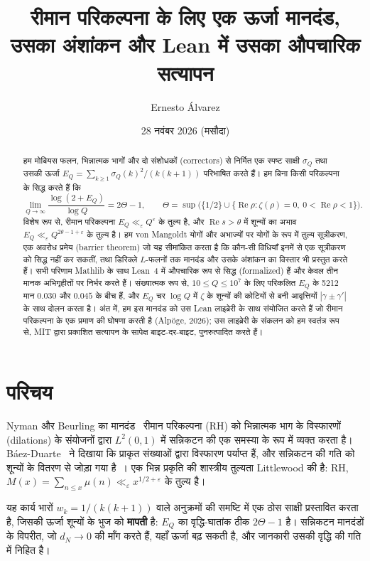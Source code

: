 \documentclass[11pt,a4paper]{amsart}
\title[रीमान परिकल्पना के लिए एक ऊर्जा मानदंड]{रीमान परिकल्पना के लिए एक ऊर्जा मानदंड, उसका अंशांकन और Lean में उसका औपचारिक सत्यापन}
\author{{\latinfont Ernesto \'Alvarez}}
\date{28 नवंबर 2026 (मसौदा)}
\theoremstyle{definition}
\theoremstyle{remark}
\renewcommand{\Re}{\operatorname{Re}}
\begin{document}
\begin{abstract}
हम मोबियस फलन, भिन्नात्मक भागों और दो संशोधकों (correctors) से निर्मित एक स्पष्ट साक्षी $\sigma_Q$ तथा उसकी ऊर्जा $E_Q=\sum_{k\ge1}\sigma_Q(k)^2/(k(k+1))$ परिभाषित करते हैं। हम बिना किसी परिकल्पना के सिद्ध करते हैं कि
\[
  \lim_{Q\to\infty}\frac{\log(2+E_Q)}{\log Q}=2\Theta-1,
  \qquad \Theta=\sup\bigl(\{1/2\}\cup\{\Re\rho:\zeta(\rho)=0,\ 0<\Re\rho<1\}\bigr).
\]
विशेष रूप से, रीमान परिकल्पना $E_Q\ll_\varepsilon Q^\varepsilon$ के तुल्य है, और $\Re s>\theta$ में शून्यों का अभाव $E_Q\ll_\varepsilon Q^{2\theta-1+\varepsilon}$ के तुल्य है। हम von Mangoldt योगों और अभाज्यों पर योगों के रूप में तुल्य सूत्रीकरण, एक अवरोध प्रमेय (barrier theorem) जो यह सीमांकित करता है कि कौन-सी विधियाँ इनमें से एक सूत्रीकरण को सिद्ध नहीं कर सकतीं, तथा डिरिक्ले $L$-फलनों तक मानदंड और उसके अंशांकन का विस्तार भी प्रस्तुत करते हैं। सभी परिणाम Mathlib के साथ Lean~4 में औपचारिक रूप से सिद्ध (formalized) हैं और केवल तीन मानक अभिगृहीतों पर निर्भर करते हैं। संख्यात्मक रूप से, $10\le Q\le10^7$ के लिए परिकलित $E_Q$ के 5212 मान $0.030$ और $0.045$ के बीच हैं, और $E_Q$ चर $\log Q$ में $\zeta$ के शून्यों की कोटियों से बनी आवृत्तियों $|\gamma\pm\gamma'|$ के साथ दोलन करता है। अंत में, हम इस मानदंड को उस Lean लाइब्रेरी के साथ संयोजित करते हैं जो रीमान परिकल्पना के एक प्रमाण की घोषणा करती है (Alp\"oge, 2026); उस लाइब्रेरी के संकलन को हम स्वतंत्र रूप से, MIT द्वारा प्रकाशित सत्यापन के सापेक्ष बाइट-दर-बाइट, पुनरुत्पादित करते हैं।
\end{abstract}

\maketitle

\section{परिचय}

Nyman और Beurling का मानदंड~\cite{Nyman,Beurling} रीमान परिकल्पना (RH) को भिन्नात्मक भाग के विस्फारणों (dilations) के संयोजनों द्वारा $L^2(0,1)$ में सन्निकटन की एक समस्या के रूप में व्यक्त करता है। Báez-Duarte~\cite{BaezDuarte} ने दिखाया कि प्राकृत संख्याओं द्वारा विस्फारण पर्याप्त हैं, और सन्निकटन की गति को शून्यों के वितरण से जोड़ा गया है~\cite{BalazardSaias,Burnol,BCF}। एक भिन्न प्रकृति की शास्त्रीय तुल्यता Littlewood की है: RH, $M(x)=\sum_{n\le x}\mu(n)\ll_\varepsilon x^{1/2+\varepsilon}$ के तुल्य है।

यह कार्य भारों $w_k=1/(k(k+1))$ वाले अनुक्रमों की समष्टि में एक ठोस साक्षी प्रस्तावित करता है, जिसकी ऊर्जा शून्यों के भुज को \textbf{मापती} है: $E_Q$ का वृद्धि-घातांक ठीक $2\Theta-1$ है। सन्निकटन मानदंडों के विपरीत, जो $d_N\to0$ की माँग करते हैं, यहाँ ऊर्जा बढ़ सकती है, और जानकारी उसकी वृद्धि की गति में निहित है।
\end{document}
